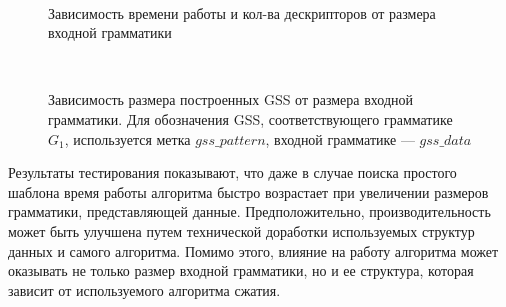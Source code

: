 \begin{figure}[h]
	\centering
{}
~
\caption{Зависимость времени работы и кол-ва дескрипторов от размера входной грамматики}
\label{time_descr}
\end{figure}

\begin{figure}[h]
	\centering
	~
	\caption{Зависимость размера построенных GSS от размера входной грамматики. Для обозначения GSS, соответствующего грамматике $G_1$, используется метка $gss\_pattern$, входной грамматике --- $gss\_data$}
	\label{gss}
\end{figure}

Результаты тестирования показывают, что даже в случае поиска простого шаблона время работы алгоритма быстро возрастает при увеличении размеров грамматики, представляющей данные. Предположительно, производительность может быть улучшена путем технической доработки используемых структур данных и самого алгоритма. Помимо этого, влияние на работу алгоритма может оказывать не только размер входной грамматики, но и ее структура, которая зависит от используемого алгоритма сжатия.
